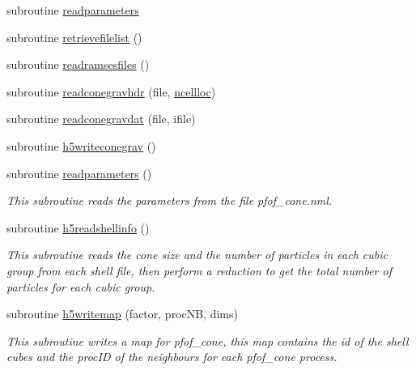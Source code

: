 \begin{DoxyCompactItemize}
subroutine \hyperlink{classmodio_a3822b26d7d81e96e4c7e885466fd82e4}{readparameters}
\item 
subroutine \hyperlink{classmodio_a49a42a212fba0853ef61f4f3360e6cb8}{retrievefilelist} ()
\item 
subroutine \hyperlink{classmodio_a65b2a30853dd9ec7641c578cb220a3fe}{readramsesfiles} ()
\item 
subroutine \hyperlink{classmodio_a781355181afb550bcc570313df840da4}{readconegravhdr} (file, \hyperlink{classmodio_a1c862995bd67ce8f4a3305dad6022064}{ncellloc})
\item 
subroutine \hyperlink{classmodio_a5ac9b7de3c680868d2114731e0dd67f2}{readconegravdat} (file, ifile)
\item 
subroutine \hyperlink{classmodio_a25a01a0565ebacb543ff8a55b5a51351}{h5writeconegrav} ()
\item 
subroutine \hyperlink{classmodio_aa5e6b5f45cf8cfc091e8e7ff25a97c68}{readparameters} ()
\begin{DoxyCompactList}\small\item\em This subroutine reads the parameters from the file pfof\-\_\-cone.\-nml. \end{DoxyCompactList}\item 
subroutine \hyperlink{classmodio_a5f1cc94eaee9d1f4f7bdca4cb63ee5bc}{h5readshellinfo} ()
\begin{DoxyCompactList}\small\item\em This subroutine reads the cone size and the number of particles in each cubic group from each shell file, then perform a reduction to get the total number of particles for each cubic group. \end{DoxyCompactList}\item 
subroutine \hyperlink{classmodio_acea0b6ec3974ee8b8e31264ce9002d89}{h5writemap} (factor, proc\-N\-B, dims)
\begin{DoxyCompactList}\small\item\em This subroutine writes a map for pfof\-\_\-cone, this map contains the id of the shell cubes and the proc\-I\-D of the neighbours for each pfof\-\_\-cone process. \end{DoxyCompactList}\end{DoxyCompactItemize}
